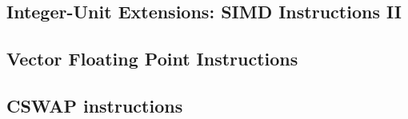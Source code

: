 

\subsection{Integer-Unit Extensions: SIMD Instructions II}
\label{sec:integer-unit-extns:simd-instructions:2:impl}

\subsection{Vector Floating Point Instructions}
\label{sec:vector-floating-point-instructions:impl}

\subsection{CSWAP instructions}
\label{sec:cswap-instructions:impl}

